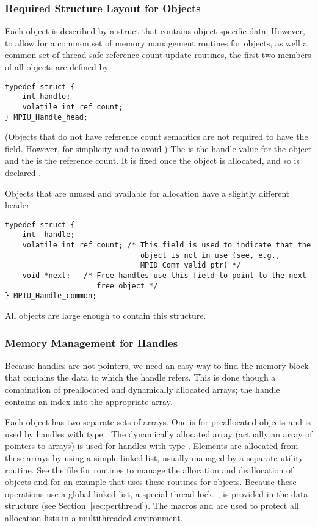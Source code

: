 \documentclass{article}
\begin{document}
\subsubsection{Required Structure Layout for Objects}
\label{sec:object-layout}
Each object is described by a struct that contains object-specific
data.  However, to allow for a common set of memory management
routines for objects, as well a common set of thread-safe reference
count update routines, the first two members of all objects are
defined by
\begin{verbatim}
typedef struct {
    int handle;
    volatile int ref_count;
} MPIU_Handle_head;
\end{verbatim}
(Objects that do not have reference count semantics are not required
to have the 
 field.  However, for simplicity and to avoid )  The  is the handle value for the
object and the  is the reference count.  It is fixed
once the object is allocated, and so is declared .

Objects that are unused and available for allocation have a slightly
different header:
\begin{verbatim}
typedef struct {
    int  handle;
    volatile int ref_count; /* This field is used to indicate that the
                               object is not in use (see, e.g., 
                               MPID_Comm_valid_ptr) */
    void *next;   /* Free handles use this field to point to the next
                     free object */
} MPIU_Handle_common;
\end{verbatim}
All objects are large enough to contain this structure.  

\subsubsection{Memory Management for Handles}
\label{sec:handle-mem-mng}
Because handles are not pointers, we need an easy way to find the
memory block that contains the data to which the handle refers.  
This is done though a combination of preallocated and dynamically
allocated arrays; the handle contains an index into the appropriate
array.  

Each object has two separate sets of arrays.  One is for preallocated
objects and is
used by handles with type .  The dynamically
allocated array 
(actually an array of pointers to arrays) is used for handles with
type .  Elements are allocated from these
arrays by using a simple linked list, usually managed by a separate
utility routine.  See the file  for routines to
manage the allocation and deallocation of objects and
 for an example that uses these routines for
 objects.
Because these operations use a global linked list, a special thread
lock, , is provided in the 
data structure (see Section~\ref{sec:perthread}).  The macros
 and 
 are used to protect all allocation
lists in a multithreaded environment.
\end{document}
